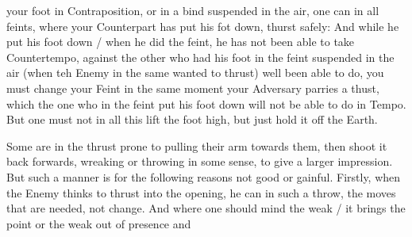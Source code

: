 your foot in Contraposition, or in a bind suspended in the air, one
can in all feints, where your Counterpart has put his fot down, thurst safely:
And while he put his foot down / when he did the feint, he has not
been able to take Countertempo, against the other who had his foot in
the feint suspended in the air (when teh Enemy in the same wanted to
thrust) well been able to do, you must change your Feint in the same moment
your Adversary parries a thust, which the one who in the feint put his
foot down will not be able to do in Tempo. But one must not in all
this lift the foot high, but just hold it off the Earth.




Some are in the thrust prone to pulling their arm towards them, then
shoot it back forwards, wreaking or throwing in some sense, to give a
larger impression. But such a manner is for the following reasons not
good or gainful. Firstly, when the Enemy thinks to thrust into the
opening, he can in such a throw, the moves that are needed, not
change. And where one should mind the weak / it brings the point or
the weak out of presence and

